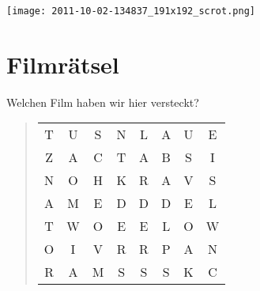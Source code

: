 \begin{multicols}{2}
	\texttt{[image: 2011-10-02-134837\_191x192\_scrot.png]}

	\section*{Filmrätsel}
	Welchen Film haben wir hier versteckt?
	\begin{quote}
		\begin{tabular}{cccccccc}
			T & U & S & N & L & A & U & E \\
			Z & A & C & T & A & B & S & I \\
			N & O & H & K & R & A & V & S \\
			A & M & E & D & D & D & E & L \\
			T & W & O & E & E & L & O & W \\
			O & I & V & R & R & P & A & N \\
			R & A & M & S & S & S & K & C \\
		\end{tabular}
	\end{quote} 

	\end{multicols}
	\newpage
